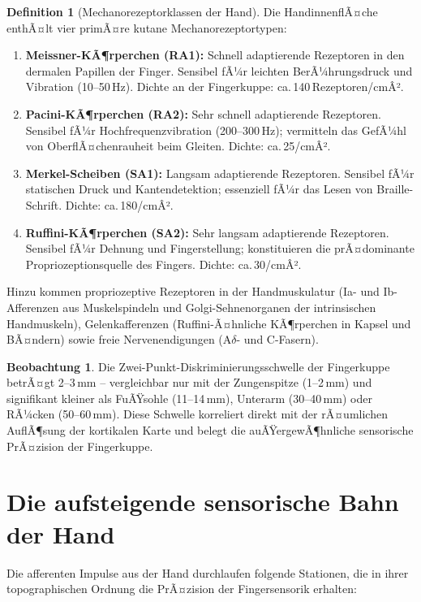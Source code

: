﻿\documentclass[12pt,a4paper]{report}
\theoremstyle{plain}
\theoremstyle{definition}
\newtheorem{definition}[theorem]{Definition}
\newtheorem{beobachtung}[theorem]{Beobachtung}
\theoremstyle{remark}
\begin{document}
\begin{definition}[Mechanorezeptorklassen der Hand]
Die HandinnenflÃ¤che enthÃ¤lt vier primÃ¤re kutane Mechanorezeptortypen:
\begin{enumerate}
\item \textbf{Meissner-KÃ¶rperchen (RA1):} Schnell adaptierende Rezeptoren
  in den dermalen Papillen der Finger. Sensibel fÃ¼r leichten BerÃ¼hrungsdruck
  und Vibration (10--50\,Hz). Dichte an der Fingerkuppe: ca.\,140\,Rezeptoren/cmÂ².
\item \textbf{Pacini-KÃ¶rperchen (RA2):} Sehr schnell adaptierende Rezeptoren.
  Sensibel fÃ¼r Hochfrequenzvibration (200--300\,Hz); vermitteln das GefÃ¼hl
  von OberflÃ¤chenrauheit beim Gleiten. Dichte: ca.\,25/cmÂ².
\item \textbf{Merkel-Scheiben (SA1):} Langsam adaptierende Rezeptoren.
  Sensibel fÃ¼r statischen Druck und Kantendetektion; essenziell fÃ¼r
  das Lesen von Braille-Schrift. Dichte: ca.\,180/cmÂ².
\item \textbf{Ruffini-KÃ¶rperchen (SA2):} Sehr langsam adaptierende Rezeptoren.
  Sensibel fÃ¼r Dehnung und Fingerstellung; konstituieren die prÃ¤dominante
  Propriozeptionsquelle des Fingers. Dichte: ca.\,30/cmÂ².
\end{enumerate}
\end{definition}

Hinzu kommen propriozeptive Rezeptoren in der Handmuskulatur
(Ia- und Ib-Afferenzen aus Muskelspindeln und Golgi-Sehnenorganen der
intrinsischen Handmuskeln), Gelenkafferenzen (Ruffini-Ã¤hnliche KÃ¶rperchen
in Kapsel und BÃ¤ndern) sowie freie Nervenendigungen (A$\delta$- und C-Fasern).

\begin{beobachtung}
Die Zwei-Punkt-Diskriminierungsschwelle der Fingerkuppe betrÃ¤gt
2--3\,mm -- vergleichbar nur mit der Zungenspitze (1--2\,mm) und
signifikant kleiner als FuÃŸsohle (11--14\,mm), Unterarm (30--40\,mm)
oder RÃ¼cken (50--60\,mm). Diese Schwelle korreliert direkt mit der
rÃ¤umlichen AuflÃ¶sung der kortikalen Karte und belegt die
auÃŸergewÃ¶hnliche sensorische PrÃ¤zision der Fingerkuppe.
\end{beobachtung}

\section{Die aufsteigende sensorische Bahn der Hand}

Die afferenten Impulse aus der Hand durchlaufen folgende Stationen,
die in ihrer topographischen Ordnung die PrÃ¤zision der Fingersensorik
erhalten:
\end{document}
